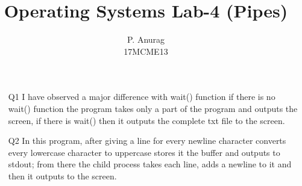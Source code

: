 \documentclass[a4paper,10pt]{article}
\title{Operating Systems Lab-4 (Pipes)}
\author{P. Anurag\\17MCME13}
\date{}
\begin{document}
\maketitle
  \begin{enumerate}
    \item[Q1] I have observed a major difference with wait() function
              if there is no wait() function the program takes only
              a part of the program and outputs the screen, if there is
              wait() then it outputs the complete txt file to the
              screen.
    \item[Q2] In this program, after giving a line for every newline
              character converts every lowercase character to uppercase
              stores it the buffer and outputs to stdout; from there 
              the child process takes each line, adds a newline to it and 
              then it outputs to the screen.
  \end{enumerate}
\end{document}
